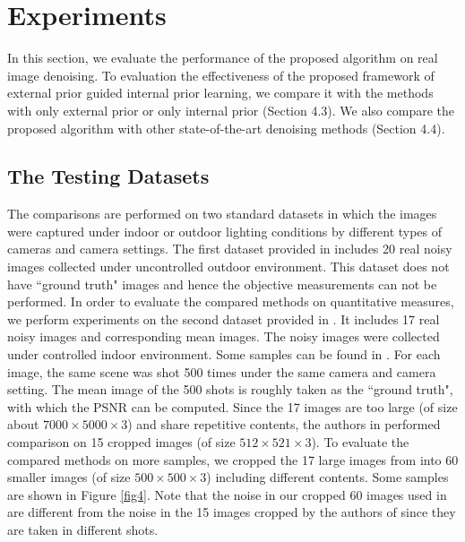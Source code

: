 \documentclass[10pt,twocolumn,letterpaper]{article}
\begin{document}
\section{Experiments}

In this section, we evaluate the performance of the proposed algorithm on real image denoising. To evaluation the effectiveness of the proposed framework of external prior guided internal prior learning, we compare it with the methods with only external prior or only internal prior (Section 4.3). We also compare the proposed algorithm with other state-of-the-art denoising methods \cite{bm3d,cbm3d,mlp,wnnm,csf,chen2015learning,crosschannel2016,noiseclinic,ncwebsite,neatimage} (Section 4.4).

\subsection{The Testing Datasets}

The comparisons are performed on two standard datasets in which the images were captured under indoor or outdoor lighting conditions by different types of cameras and camera settings. The first dataset provided in \cite{ncwebsite} includes 20 real noisy images collected under uncontrolled outdoor environment. This dataset does not have ``ground truth" images and hence the objective measurements can not be performed. In order to evaluate the compared methods on quantitative measures, we perform experiments on the second dataset provided in \cite{crosschannel2016}. It includes 17 real noisy images and corresponding mean images. The noisy images were collected under controlled indoor environment. Some samples can be found in \cite{crosschannel2016}. For each image, the same scene was shot 500 times under the same camera and camera setting. The mean image of the 500 shots is roughly taken as the ``ground truth", with which the PSNR can be computed. Since the 17 images are too large (of size about $7000\times5000\times3$) and share repetitive contents, the authors in \cite{crosschannel2016} performed comparison on 15 cropped images (of size $512\times 521\times3$). To evaluate the compared methods on more samples, we cropped the 17 large images from \cite{crosschannel2016} into 60 smaller images (of size $500\times 500\times3$) including different contents. Some samples are shown in Figure \ref{fig4}. Note that the noise in our cropped 60 images used in \cite{crosschannel2016} are different from the noise in the 15 images cropped by the authors of \cite{crosschannel2016} since they are taken in different shots.
\end{document}
